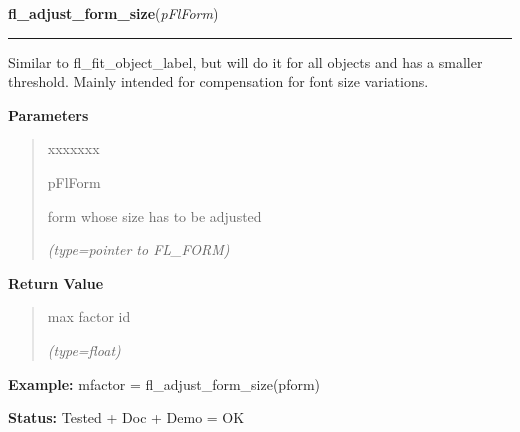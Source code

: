 \hspace{.8\funcindent}\begin{boxedminipage}{\funcwidth}

    \raggedright \textbf{fl\_adjust\_form\_size}(\textit{pFlForm})

    \vspace{-1.5ex}

    \rule{\textwidth}{0.5\fboxrule}
\setlength{\parskip}{2ex}
    Similar to fl\_fit\_object\_label, but will do it for all objects and 
    has a smaller threshold. Mainly intended for compensation for font size
    variations.

\setlength{\parskip}{1ex}
      \textbf{Parameters}
      \vspace{-1ex}

      \begin{quote}
        \begin{Ventry}{xxxxxxx}

          \item[pFlForm]

          form whose size has to be adjusted

            {\it (type=pointer to FL\_FORM)}

        \end{Ventry}

      \end{quote}

      \textbf{Return Value}
    \vspace{-1ex}

      \begin{quote}
      max factor id

      {\it (type=float)}

      \end{quote}

\textbf{Example:} mfactor = fl\_adjust\_form\_size(pform)



\textbf{Status:} Tested + Doc + Demo = OK



    \end{boxedminipage}

    \label{xformslib:flbasic:fl_form_is_visible}

    \vspace{0.5ex}


